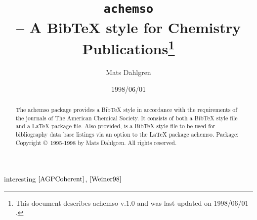\documentclass{article}
\begin{document}
\title{\texttt{achemso}\\
-- A BibTeX style for Chemistry Publications\thanks{%
This document describes \textsf{achemso} v.1.0{} and was last updated on
1998/06/01 .}}
\author{Mats Dahlgren}
\date{1998/06/01}
\maketitle

\begin{abstract}
The \textsf{achemso} package provides a BibTeX style in accordance with the
requirements of the journals of The American Chemical Society. It consists
of both a BibTeX style file and a LaTeX package file. Also provided, is a
BibTeX style file to be used for bibliography data base listings via an
option to the LaTeX package \textsf{achemso}. \newline
Package: Copyright \copyright\ 1995-1998 by Mats Dahlgren. All rights
reserved.
\end{abstract}

interesting $\cite{AGPCoherent}$, $\cite{Weiner98}$ 


\end{document}
